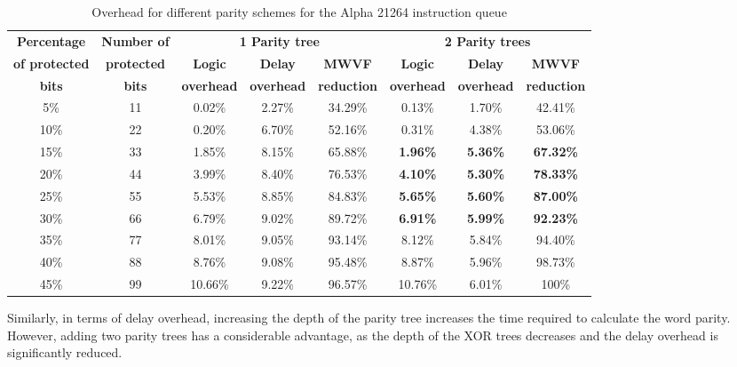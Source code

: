\documentclass[12pt]{yalephd}
\begin{document}
\begin{table}[!ht]
\tiny
\begin{center}
\caption{Overhead for different parity schemes for the Alpha 21264 instruction queue}\label{sC5tParityOverhead}
\begin{tabular}{||c|c|c|c|c|c|c|c||}
\hline
\hline
{\bf Percentage} & {\bf Number of} &  \multicolumn{3}{c|}{\bf 1 Parity tree} & \multicolumn{3}{c||}{\bf 2 Parity trees}  \\
{\bf of protected} &	{\bf protected}		& {\bf Logic}			& {\bf Delay}    & {\bf MWVF}      & {\bf Logic}			& {\bf Delay}  & {\bf MWVF}   \\
{\bf bits}  		& {\bf bits}	& {\bf overhead}	& {\bf overhead} & {\bf reduction} &{\bf overhead}	  & {\bf overhead} & {\bf reduction} \\
\hline
\hline
{ 5\%}  & 11 & 0.02\% & 2.27\% &  34.29\% & 0.13\% & 1.70\% & 42.41\%  \\
\hline
{ 10\%} & 22 & 0.20\% & 6.70\% &  52.16\% & 0.31\% & 4.38\% & 53.06\% \\
\hline
{ 15\%} & 33 & 1.85\% & 8.15\% &  65.88\% & {\bf 1.96\%} & {\bf 5.36\%} & {\bf 67.32\%} \\
\hline
{ 20\%} & 44 & 3.99\% & 8.40\% &  76.53\% & {\bf 4.10\%} & {\bf 5.30\%} & {\bf 78.33\%}   \\
\hline
{ 25\%} & 55 & 5.53\% & 8.85\% &  84.83\% & {\bf 5.65\%} & {\bf 5.60\%} & {\bf 87.00\%}   \\
\hline
{ 30\%} & 66 & 6.79\% & 9.02\% &  89.72\% & {\bf 6.91\%} & {\bf 5.99\%} & {\bf 92.23\%}  \\
\hline
{ 35\%} & 77 & 8.01\% & 9.05\% &  93.14\% & 8.12\% & 5.84\% & 94.40\%  \\
\hline
{ 40\%} & 88 & 8.76\% & 9.08\% &  95.48\% & 8.87\% & 5.96\% & 98.73\%   \\
\hline
{ 45\%} & 99 & 10.66\% & 9.22\% &  96.57\% & 10.76\% & 6.01\% & 100\% \\
\hline
\hline
\end{tabular}
\end{center}
\end{table}

 Similarly, in terms of delay overhead, increasing the depth of the parity tree increases the time required to calculate the word parity. However, adding two parity trees has a considerable advantage, as the depth of the XOR trees decreases and the delay overhead is significantly reduced.
\end{document}
